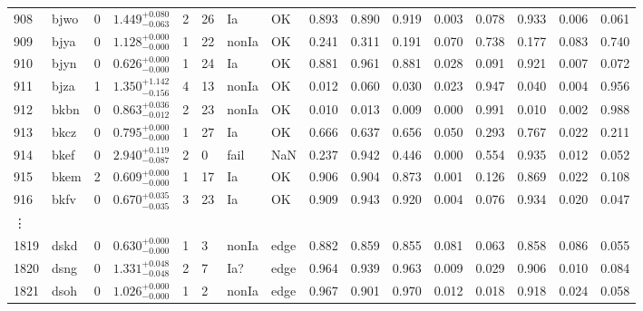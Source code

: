 \documentclass[useamsfonts]{pasj01}
\begin{document}
\begin{table}[ht]
{\begin{tabular}{p{2em}p{1em}p{1em}lp{2em}p{1em}p{2em}p{2em}p{2em}p{2em}p{2em}p{2em}p{2em}p{2em}p{2em}p{2em}}
908  &  bjwo &     0 &    $1.449_{-0.063}^{+0.080}$ &         2 &   26 &     Ia &     OK &    0.893 &    0.890 &    0.919 &    0.003 &    0.078 &    0.933 &    0.006 &    0.061 \\
909  &  bjya &     0 &    $1.128_{-0.000}^{+0.000}$ &         1 &   22 &  nonIa &     OK &    0.241 &    0.311 &    0.191 &    0.070 &    0.738 &    0.177 &    0.083 &    0.740 \\
910  &  bjyn &     0 &    $0.626_{-0.000}^{+0.000}$ &         1 &   24 &     Ia &     OK &    0.881 &    0.961 &    0.881 &    0.028 &    0.091 &    0.921 &    0.007 &    0.072 \\
911  &  bjza &     1 &    $1.350_{-0.156}^{+1.142}$ &         4 &   13 &  nonIa &     OK &    0.012 &    0.060 &    0.030 &    0.023 &    0.947 &    0.040 &    0.004 &    0.956 \\
912  &  bkbn &     0 &    $0.863_{-0.012}^{+0.036}$ &         2 &   23 &  nonIa &     OK &    0.010 &    0.013 &    0.009 &    0.000 &    0.991 &    0.010 &    0.002 &    0.988 \\
913  &  bkcz &     0 &    $0.795_{-0.000}^{+0.000}$ &         1 &   27 &     Ia &     OK &    0.666 &    0.637 &    0.656 &    0.050 &    0.293 &    0.767 &    0.022 &    0.211 \\
914  &  bkef &     0 &    $2.940_{-0.087}^{+0.119}$ &         2 &    0 &   fail &    NaN &    0.237 &    0.942 &    0.446 &    0.000 &    0.554 &    0.935 &    0.012 &    0.052 \\
915  &  bkem &     2 &    $0.609_{-0.000}^{+0.000}$ &         1 &   17 &     Ia &     OK &    0.906 &    0.904 &    0.873 &    0.001 &    0.126 &    0.869 &    0.022 &    0.108 \\
916  &  bkfv &     0 &    $0.670_{-0.035}^{+0.035}$ &         3 &   23 &     Ia &     OK &    0.909 &    0.943 &    0.920 &    0.004 &    0.076 &    0.934 &    0.020 &    0.047 \\
\vdots & & & & & & & & & & & & & & & \\
1819 &  dskd &     0 &    $0.630_{-0.000}^{+0.000}$ &         1 &    3 &  nonIa &   edge &    0.882 &    0.859 &    0.855 &    0.081 &    0.063 &    0.858 &    0.086 &    0.055 \\
1820 &  dsng &     0 &    $1.331_{-0.048}^{+0.048}$ &         2 &    7 &    Ia? &   edge &    0.964 &    0.939 &    0.963 &    0.009 &    0.029 &    0.906 &    0.010 &    0.084 \\
1821 &  dsoh &     0 &    $1.026_{-0.000}^{+0.000}$ &         1 &    2 &  nonIa &   edge &    0.967 &    0.901 &    0.970 &    0.012 &    0.018 &    0.918 &    0.024 &    0.058 \\

\end{tabular}}
\end{table}
\end{document}
